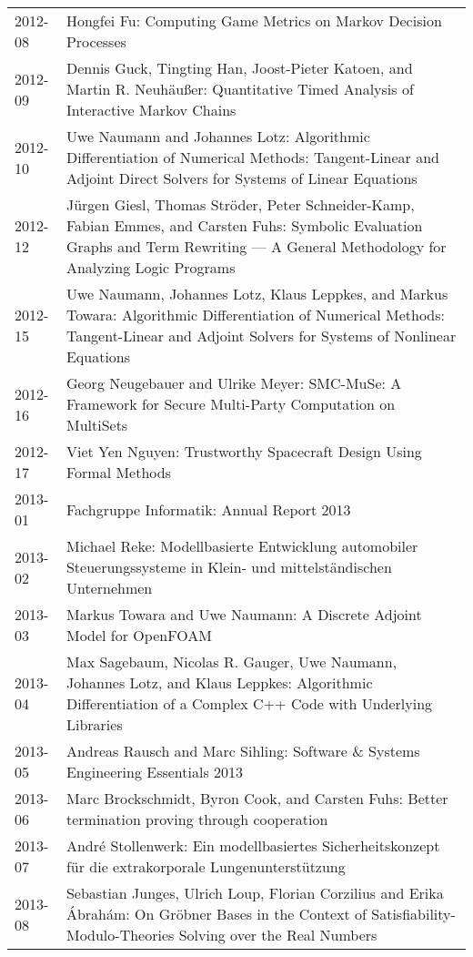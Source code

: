 \documentclass[color]{aib}
\begin{document}
\begin{longtable}{lp{11cm}}
2012-08 & Hongfei Fu:         Computing Game Metrics on Markov Decision Processes\\
2012-09 & Dennis Guck, Tingting Han, Joost-Pieter Katoen, and Martin R. Neuh\"{a}u\ss{}er:         Quantitative Timed Analysis of Interactive Markov Chains\\
2012-10 & Uwe Naumann and Johannes Lotz:         Algorithmic Differentiation of Numerical Methods: Tangent-Linear and Adjoint Direct Solvers for Systems of Linear Equations\\
2012-12 & J\"{u}rgen Giesl, Thomas Str\"{o}der, Peter Schneider-Kamp, Fabian Emmes, and Carsten Fuhs:         Symbolic Evaluation Graphs and Term Rewriting --- A General Methodology for Analyzing Logic Programs\\
2012-15 & Uwe Naumann, Johannes Lotz, Klaus Leppkes, and Markus Towara:         Algorithmic Differentiation of Numerical Methods: Tangent-Linear and Adjoint Solvers for Systems of Nonlinear Equations\\
2012-16 & Georg Neugebauer and Ulrike Meyer:         SMC-MuSe: A Framework for Secure Multi-Party Computation on MultiSets\\
2012-17 & Viet Yen Nguyen:         Trustworthy Spacecraft Design Using Formal Methods\\
2013-01  &Fachgruppe Informatik:      Annual Report 2013\\
2013-02 & Michael Reke:         Modellbasierte Entwicklung automobiler Steuerungssysteme in Klein- und mittelst\"{a}ndischen Unternehmen\\
2013-03 & Markus Towara and Uwe Naumann:         A Discrete Adjoint Model for OpenFOAM\\
2013-04 & Max Sagebaum, Nicolas R. Gauger, Uwe Naumann, Johannes Lotz, and Klaus Leppkes:         Algorithmic Differentiation of a Complex C++ Code with Underlying Libraries\\
2013-05 & Andreas Rausch and Marc Sihling:         Software \& Systems Engineering Essentials 2013\\
2013-06 & Marc Brockschmidt, Byron Cook, and Carsten Fuhs:         Better termination proving through cooperation\\
2013-07 & Andr\'{e} Stollenwerk:         Ein modellbasiertes Sicherheitskonzept f\"{u}r die extrakorporale Lungenunterst\"{u}tzung\\
2013-08 & Sebastian Junges, Ulrich Loup, Florian Corzilius and Erika \'{A}brah\'{a}m:         On Gr\"{o}bner Bases in the Context of Satisfiability-Modulo-Theories Solving over the Real Numbers\\

\end{longtable}
\end{document}
